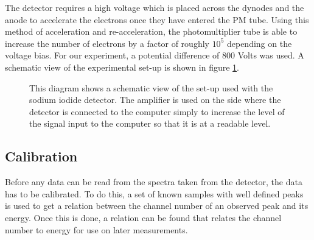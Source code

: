 The detector requires a high voltage which is placed across the dynodes and the anode to accelerate the electrons once they have entered the PM tube. Using this method of acceleration and re-acceleration, the photomultiplier tube is able to increase the number of electrons by a factor of roughly $10^5$ depending on the voltage bias\cite{baratta}. For our experiment, a potential difference of 800 Volts was used. A schematic view of the experimental set-up is shown in figure \ref{fig:experimentalsetp}.
\begin{figure}[ht]
	\centering
\caption{This diagram shows a schematic view of the set-up used with the sodium iodide detector. The amplifier is used on the side where the detector is connected to the computer simply to increase the level of the signal input to the computer so that it is at a readable level.\label{fig:experimentalsetp}}
\end{figure}


\subsection{Calibration} %
\label{sub:calibration}
Before any data can be read from the spectra taken from the detector, the data has to be calibrated. To do this, a set of known samples with well defined peaks is used to get a relation between the channel number of an observed peak and its energy. Once this is done, a relation can be found that relates the channel number to energy for use on later measurements.

